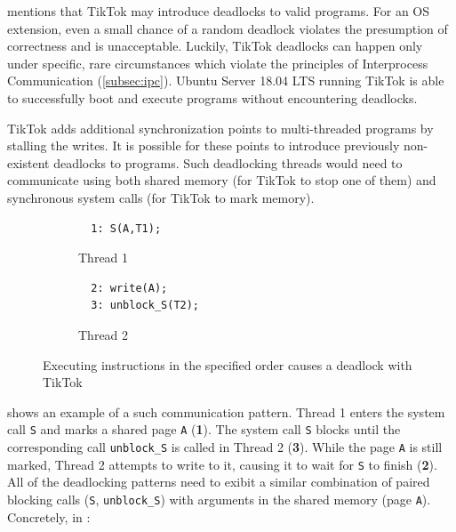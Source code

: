  mentions that TikTok may introduce deadlocks to valid
programs. For an OS extension, even a small chance of a random deadlock violates
the presumption of correctness and is unacceptable. Luckily, TikTok deadlocks
can happen only under specific, rare circumstances which violate the principles
of Interprocess Communication (\cref{subsec:ipc}). Ubuntu Server 18.04 LTS
running TikTok is able to successfully boot and execute programs without
encountering deadlocks.


TikTok adds additional synchronization points to multi-threaded programs by
stalling the writes. It is possible for these points to introduce previously
non-existent deadlocks to programs. Such deadlocking threads would need to
communicate using both shared memory (for TikTok to stop one of them) and
synchronous system calls (for TikTok to mark memory).

\begin{figure}
  \centering
  \begin{subfigure}[b]{0.45\linewidth}
  \begin{minipage}{\linewidth}
  \begin{lstlisting}
  1: S(A,T1);  
  \end{lstlisting}
  \end{minipage}
  \caption{Thread 1}
  \end{subfigure}
  \hfill
  \begin{subfigure}[b]{0.45\linewidth}
  \begin{minipage}{\linewidth}
  \begin{lstlisting}
  2: write(A);
  3: unblock_S(T2);
  \end{lstlisting}  
  \end{minipage}
  \caption{Thread 2}
  \end{subfigure}
  \caption{Executing instructions in the specified order causes a deadlock with TikTok}
  \label{fig:deadlock}
\end{figure}


 shows an example of a such communication pattern. Thread 1
enters the system call \texttt{S} and marks a shared page \texttt{A} (\textbf{1}). The
system call \texttt{S} blocks until the corresponding call \texttt{unblock\_S} is called
in Thread 2 (\textbf{3}). While the page \texttt{A} is still marked, Thread 2
attempts to write to it, causing it to wait for \texttt{S} to finish
(\textbf{2}). All of the deadlocking patterns need to exibit a similar combination
of paired blocking calls (\texttt{S}, \texttt{unblock\_S}) with arguments in the shared
memory (page \texttt{A}). Concretely, in :

